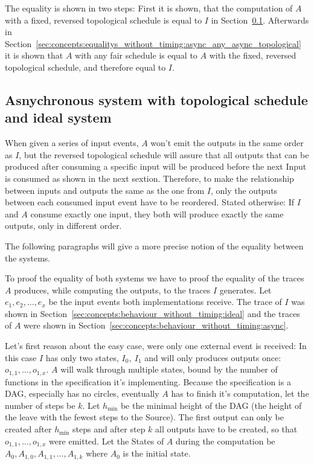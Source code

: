 The equality is shown in two steps: First it is shown, that the computation of \(A\) with a fixed, reversed topological
schedule is equal to \(I\) in Section~\ref{sec:concepts:equalitys_without_timing:ideal_async_topological}.
Afterwards in Section~\ref{sec:concepts:equalitys_without_timing:async_any_async_topological} it is shown that \(A\) with any fair schedule is equal to \(A\) with the fixed, reversed topological schedule,
and therefore equal to \(I\).

\subsection{Asnychronous system with topological schedule and ideal system}
\label{sec:concepts:equalitys_without_timing:ideal_async_topological}

When given a series of input events, \(A\) won't emit the outputs in the same order as \(I\),
but the reversed topological schedule will assure that all outputs that can be produced after consuming a specific input
will be produced before the next Input is consumed as shown in the next sextion.
Therefore, to make the relationship between inputs and outputs the same as the one from \(I\), only the outputs between
each consumed input event have to be reordered.
Stated otherwise: If \(I\) and \(A\) consume exactly one input, they both will produce exactly the same outputs,
only in different order.

The following paragraphs will give a more precise notion of the equality between the systems.

To proof the equality of both systems we have to proof the equality of the traces \(A\) produces, while computing the
outputs, to the traces \(I\) generates.
Let \(e_1, e_2, \dots, e_x\) be the input events both implementations receive.
The trace of \(I\) was shown in Section~\ref{sec:concepts:behaviour_without_timing:ideal} and the traces of \(A\) were shown in Section~\ref{sec:concepts:behaviour_without_timing:async}.


Let's first reason about the easy case, were only one external event is received:
In this case \(I\) has only two states, \(I_0,\ I_1\) and will only produces outputs once: \(o_{1,1}, \dots, o_{1,x}\).
\(A\) will walk through multiple states, bound by the number of functions in the specification it's implementing.
Because the specification is a DAG, especially has no circles, eventually \(A\) has to finish it's computation, let the
number of steps be \(k\).
Let \(h_{\min}\) be the minimal height of the DAG (the height of the leave with the fewest steps to the Source).
The first output can only be created after \(h_{\min}\) steps and after step \(k\) all outputs have to be created, so that
\(o_{1,1}, \dots, o_{1,x}\) were emitted.
Let the States of \(A\) during the computation be \(A_{0}, A_{1,0}, A_{1,1}, \dots, A_{1,k}\) where \(A_0\) is the initial state.

